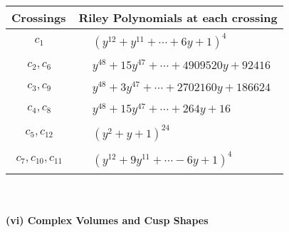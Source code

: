 \documentclass[1p]{elsarticle_modified}
\theoremstyle{definition}
\begin{document}
\begin{tabular}{m{50pt}|m{274pt}}
Crossings & \hspace{64pt}Riley Polynomials at each crossing \\
\hline $$\begin{aligned}c_{1}\end{aligned}$$&$\begin{aligned}
&(y^{12}+y^{11}+\cdots+6 y+1)^{4}
\end{aligned}$\\
\hline $$\begin{aligned}c_{2},c_{6}\end{aligned}$$&$\begin{aligned}
&y^{48}+15 y^{47}+\cdots+4909520 y+92416
\end{aligned}$\\
\hline $$\begin{aligned}c_{3},c_{9}\end{aligned}$$&$\begin{aligned}
&y^{48}+3 y^{47}+\cdots+2702160 y+186624
\end{aligned}$\\
\hline $$\begin{aligned}c_{4},c_{8}\end{aligned}$$&$\begin{aligned}
&y^{48}+15 y^{47}+\cdots+264 y+16
\end{aligned}$\\
\hline $$\begin{aligned}c_{5},c_{12}\end{aligned}$$&$\begin{aligned}
&(y^2+y+1)^{24}
\end{aligned}$\\
\hline $$\begin{aligned}c_{7},c_{10},c_{11}\end{aligned}$$&$\begin{aligned}
&(y^{12}+9 y^{11}+\cdots-6 y+1)^{4}
\end{aligned}$\\
\hline
\end{tabular}\\~\\
\newpage\flushleft \textbf{(vi) Complex Volumes and Cusp Shapes}
\end{document}
